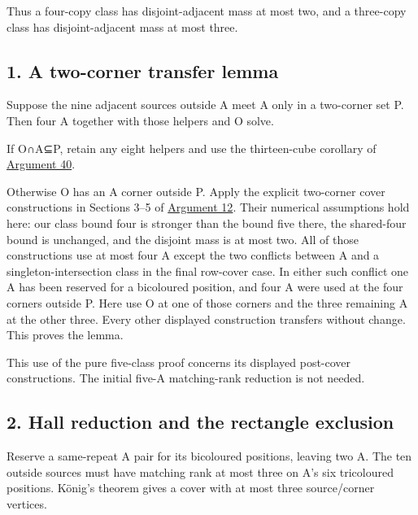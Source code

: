 \documentclass[
  10pt,
]{article}
\begin{document}
Thus a four-copy class has disjoint-adjacent mass at most two, and a
three-copy class has disjoint-adjacent mass at most three.

\hypertarget{a-two-corner-transfer-lemma}{%
\subsection*{1. A two-corner transfer
lemma}\label{a-two-corner-transfer-lemma}}

Suppose the nine adjacent sources outside A meet A only in a two-corner
set P. Then four A together with those helpers and O solve.

If O∩A⊆P, retain any eight helpers and use the thirteen-cube corollary
of \protect\hyperlink{arg-40}{Argument 40}.

Otherwise O has an A corner outside P. Apply the explicit two-corner
cover constructions in Sections 3--5 of
\protect\hyperlink{arg-12}{Argument 12}. Their numerical assumptions
hold here: our class bound four is stronger than the bound five there,
the shared-four bound is unchanged, and the disjoint mass is at most
two. All of those constructions use at most four A except the two
conflicts between A and a singleton-intersection class in the final
row-cover case. In either such conflict one A has been reserved for a
bicoloured position, and four A were used at the four corners outside P.
Here use O at one of those corners and the three remaining A at the
other three. Every other displayed construction transfers without
change. This proves the lemma.

This use of the pure five-class proof concerns its displayed post-cover
constructions. The initial five-A matching-rank reduction is not needed.

\hypertarget{hall-reduction-and-the-rectangle-exclusion}{%
\subsection*{2. Hall reduction and the rectangle
exclusion}\label{hall-reduction-and-the-rectangle-exclusion}}

Reserve a same-repeat A pair for its bicoloured positions, leaving two
A. The ten outside sources must have matching rank at most three on A's
six tricoloured positions. König's theorem gives a cover with at most
three source/corner vertices.
\end{document}
